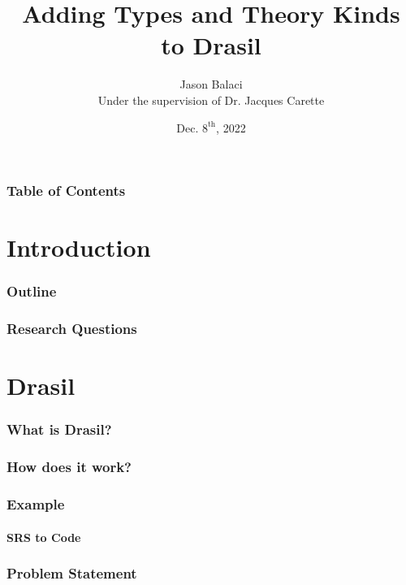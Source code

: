\documentclass[xcolor={dvipsnames}]{beamer}
\title{Adding Types and Theory Kinds to Drasil}
\author[J. Balaci]{Jason Balaci\\\small{}Under the supervision of Dr. Jacques Carette}
\institute[McMaster U.]{McMaster University}
\date{Dec. $8^{\text{th}}$, 2022}
\begin{document}
\frame{\titlepage}


\begin{frame}
\frametitle{Table of Contents}
\tableofcontents
\end{frame}

\section{Introduction}

\begin{frame}
  \frametitle{Outline}
\end{frame}

\begin{frame}
  \frametitle{Research Questions}
\end{frame}

\section{Drasil}

\begin{frame}
  \frametitle{What is Drasil?}
\end{frame}

\begin{frame}
  \frametitle{How does it work?}
\end{frame}

\begin{frame}
  \frametitle{Example}
  \framesubtitle{SRS to Code}
\end{frame}

\begin{frame}
  \frametitle{Problem Statement}
\end{frame}

\end{document}
